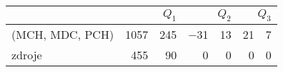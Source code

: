 \begin{tabular}{lr@{${}\pm{}$}rr@{${}\pm{}$}rr@{${}\pm{}$}r}
        \toprule
        &\multicolumn{2}{r}{$Q_1$} & \multicolumn{2}{r}{$Q_2$}  & \multicolumn{2}{r}{$Q_3$} \\
        \midrule
(MCH, MDC, PCH) & 1057&245 & $-$31&13 & 21&7\\
        \midrule
zdroje & 455&90 & 0&0 & 0&0\\
        \bottomrule
    \end{tabular}
